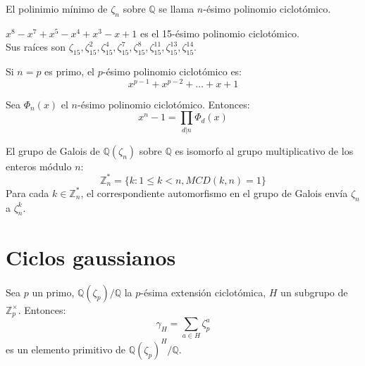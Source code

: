\begin{definition}
    El polinimio mínimo de $\zeta_n$ sobre $\mathbb{Q}$ se llama $n$-ésimo polinomio ciclotómico.
\end{definition}

\begin{example}
    $x^8-x^7+x^5-x^4+x^3-x+1$ es el 15-ésimo polinomio ciclotómico.\\
    Sus raíces son $\zeta_{15}, \zeta^2_{15}, \zeta^4_{15}, \zeta^7_{15}, \zeta^8_{15}, \zeta^{11}_{15}, \zeta^{13}_{15}, \zeta^{14}_{15}$.
\end{example}

\begin{remark}
    Si $n = p$ es primo, el $p$-ésimo polinomio ciclotómico es:
    $$x^{p-1} + x^{p-2} + \dots + x + 1$$
\end{remark}

\begin{proposition}
    Sea $\Phi_n(x)$ el $n$-ésimo polinomio ciclotómico. Entonces:
    $$x^n-1 = \prod_{d | n} \Phi_d(x)$$
\end{proposition}

\begin{theorem}
    El grupo de Galois de $\mathbb{Q}(\zeta_n)$ sobre $\mathbb{Q}$ es isomorfo al grupo multiplicativo de los enteros módulo $n$:
    $$\mathbb{Z}^*_n = \{ k : 1 \leq k < n, MCD(k, n) = 1 \}$$
    Para cada $k \in \mathbb{Z}^*_n$, el correspondiente automorfismo en el grupo de Galois envía $\zeta_n$ a $\zeta^k_n$.
\end{theorem}

\section{Ciclos gaussianos}

\begin{theorem}[Gauss]
    Sea $p$ un primo, $\mathbb{Q}(\zeta_p)/\mathbb{Q}$ la $p$-ésima extensión ciclotómica, $H$ un subgrupo de $\mathbb{Z}^\times_p$. Entonces:
    $$\gamma_H = \sum_{a \in H} \zeta^a_p$$
    es un elemento primitivo de $\mathbb{Q}(\zeta_p)^H/\mathbb{Q}$.
\end{theorem}

